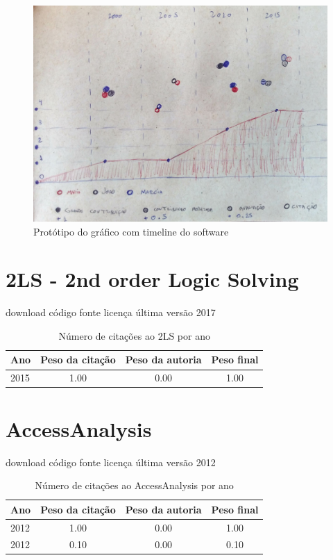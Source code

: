 
%

\label{softwares-summary}

\begin{figure}[h]
  \center
  \includegraphics[scale=0.35]{imagens/software-timeline-wireframe.jpg}
  \caption{Protótipo do gráfico com timeline do software}
\end{figure}

\section{2LS - 2nd order Logic Solving}
\checkmark download
\checkmark código fonte
\checkmark licença
\checkmark última versão 2017
\begin{table}[H]
\caption{Número de citações ao 2LS  por ano}
\centering
\begin{tabular}{| l | c | c | c |}
  \hline
  Ano & Peso da citação & Peso da autoria & Peso final \\
  \hline
  2015
    & 1.00
    & 0.00
    & {\color{blue} 1.00} \\
\hline
\end{tabular}
\end{table}
\section{AccessAnalysis}
\checkmark download
\checkmark código fonte
\checkmark licença
\checkmark última versão 2012
\begin{table}[H]
\caption{Número de citações ao AccessAnalysis por ano}
\centering
\begin{tabular}{| l | c | c | c |}
  \hline
  Ano & Peso da citação & Peso da autoria & Peso final \\
  \hline
  2012
    & 1.00
    & 0.00
    & {\color{blue} 1.00} \\
  2012
    & 0.10
    & 0.00
    & {\color{red} 0.10} \\
\hline
\end{tabular}
\end{table}
